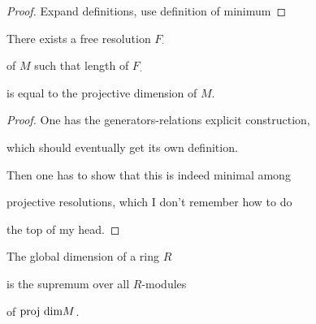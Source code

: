\begin{proof}

  Expand definitions, use definition of minimum

\end{proof}



\begin{proposition}

  \label{prop:existence_min_free_resl}


  There exists a free resolution $F_\cdot$

  of $M$ such that length of $F_\cdot$

  is equal to the projective dimension of $M$.

\end{proposition}



\begin{proof}

  One has the generators-relations explicit construction,

  which should eventually get its own definition.

  Then one has to show that this is indeed minimal among

  projective resolutions, which I don't remember how to do

  the top of my head.

\end{proof}












\begin{definition}

  \label{def:globdim}


  The global dimension of a ring $R$

  is the supremum over all $R$-modules

  of $\text{proj dim} M$.

\end{definition}



